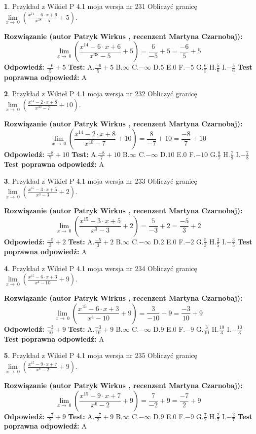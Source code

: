 \documentclass[12pt, a4paper]{article}
\theoremstyle{definition} %
\newtheorem{zad}{}
\newcommand{\zadStart}[1]{\begin{zad}#1\newline}
\newcommand{\zadStop}{\end{zad}}
\newcommand{\rozwStart}[2]{\noindent \textbf{Rozwiązanie (autor #1 , recenzent #2): }\newline}
\newcommand{\rozwStop}{\newline}
\newcommand{\odpStart}{\noindent \textbf{Odpowiedź:}\newline}
\newcommand{\odpStop}{\newline}
\newcommand{\testStart}{\noindent \textbf{Test:}\newline}
\newcommand{\testStop}{\newline}
\newcommand{\kluczStart}{\noindent \textbf{Test poprawna odpowiedź:}\newline}
\newcommand{\kluczStop}{\newline}
\begin{document}
\zadStart{Przykład z Wikieł P 4.1 moja wersja nr 231}
Obliczyć granicę $\lim\limits_{x\to\ 0}(\frac{x^{14}-6 \cdot x +6}{x^{38}-5}+5)$.
\zadStop
\rozwStart{Patryk Wirkus}{Martyna Czarnobaj}
$$\lim\limits_{x\to\ 0}(\frac{x^{14}-6 \cdot x +6}{x^{38}-5}+5)=\frac{6}{-5}+5=\frac{-6}{5}+5$$
\rozwStop
\odpStart
$\frac{-6}{5}+5$
\odpStop
\testStart
A.$\frac{-6}{5}+5$
B.$\infty$
C.$-\infty$
D.$5$
E.$0$
F.$-5$
G.$\frac{6}{5}$
H.$\frac{5}{6}$
I.$-\frac{5}{6}$
\testStop
\kluczStart
A
\kluczStop



\zadStart{Przykład z Wikieł P 4.1 moja wersja nr 232}
Obliczyć granicę $\lim\limits_{x\to\ 0}(\frac{x^{14}-2 \cdot x +8}{x^{40}-7}+10)$.
\zadStop
\rozwStart{Patryk Wirkus}{Martyna Czarnobaj}
$$\lim\limits_{x\to\ 0}(\frac{x^{14}-2 \cdot x +8}{x^{40}-7}+10)=\frac{8}{-7}+10=\frac{-8}{7}+10$$
\rozwStop
\odpStart
$\frac{-8}{7}+10$
\odpStop
\testStart
A.$\frac{-8}{7}+10$
B.$\infty$
C.$-\infty$
D.$10$
E.$0$
F.$-10$
G.$\frac{8}{7}$
H.$\frac{7}{8}$
I.$-\frac{7}{8}$
\testStop
\kluczStart
A
\kluczStop



\zadStart{Przykład z Wikieł P 4.1 moja wersja nr 233}
Obliczyć granicę $\lim\limits_{x\to\ 0}(\frac{x^{15}-3 \cdot x +5}{x^{3}-3}+2)$.
\zadStop
\rozwStart{Patryk Wirkus}{Martyna Czarnobaj}
$$\lim\limits_{x\to\ 0}(\frac{x^{15}-3 \cdot x +5}{x^{3}-3}+2)=\frac{5}{-3}+2=\frac{-5}{3}+2$$
\rozwStop
\odpStart
$\frac{-5}{3}+2$
\odpStop
\testStart
A.$\frac{-5}{3}+2$
B.$\infty$
C.$-\infty$
D.$2$
E.$0$
F.$-2$
G.$\frac{5}{3}$
H.$\frac{3}{5}$
I.$-\frac{3}{5}$
\testStop
\kluczStart
A
\kluczStop



\zadStart{Przykład z Wikieł P 4.1 moja wersja nr 234}
Obliczyć granicę $\lim\limits_{x\to\ 0}(\frac{x^{15}-6 \cdot x +3}{x^{4}-10}+9)$.
\zadStop
\rozwStart{Patryk Wirkus}{Martyna Czarnobaj}
$$\lim\limits_{x\to\ 0}(\frac{x^{15}-6 \cdot x +3}{x^{4}-10}+9)=\frac{3}{-10}+9=\frac{-3}{10}+9$$
\rozwStop
\odpStart
$\frac{-3}{10}+9$
\odpStop
\testStart
A.$\frac{-3}{10}+9$
B.$\infty$
C.$-\infty$
D.$9$
E.$0$
F.$-9$
G.$\frac{3}{10}$
H.$\frac{10}{3}$
I.$-\frac{10}{3}$
\testStop
\kluczStart
A
\kluczStop



\zadStart{Przykład z Wikieł P 4.1 moja wersja nr 235}
Obliczyć granicę $\lim\limits_{x\to\ 0}(\frac{x^{15}-9 \cdot x +7}{x^{6}-2}+9)$.
\zadStop
\rozwStart{Patryk Wirkus}{Martyna Czarnobaj}
$$\lim\limits_{x\to\ 0}(\frac{x^{15}-9 \cdot x +7}{x^{6}-2}+9)=\frac{7}{-2}+9=\frac{-7}{2}+9$$
\rozwStop
\odpStart
$\frac{-7}{2}+9$
\odpStop
\testStart
A.$\frac{-7}{2}+9$
B.$\infty$
C.$-\infty$
D.$9$
E.$0$
F.$-9$
G.$\frac{7}{2}$
H.$\frac{2}{7}$
I.$-\frac{2}{7}$
\testStop
\kluczStart
A
\kluczStop
\end{document}
